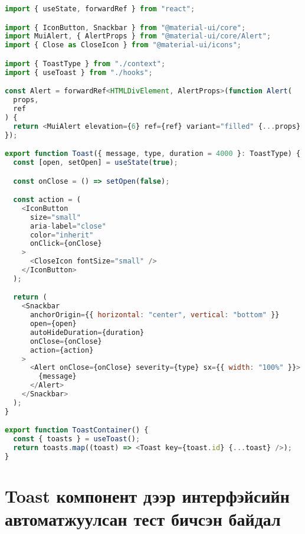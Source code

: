 \begin{lstlisting}[language=Javascript, frame=single]
import { useState, forwardRef } from "react";

import { IconButton, Snackbar } from "@material-ui/core";
import MuiAlert, { AlertProps } from "@material-ui/core/Alert";
import { Close as CloseIcon } from "@material-ui/icons";

import { ToastType } from "./context";
import { useToast } from "./hooks";

const Alert = forwardRef<HTMLDivElement, AlertProps>(function Alert(
  props,
  ref
) {
  return <MuiAlert elevation={6} ref={ref} variant="filled" {...props} />;
});

export function Toast({ message, type, duration = 4000 }: ToastType) {
  const [open, setOpen] = useState(true);

  const onClose = () => setOpen(false);

  const action = (
    <IconButton
      size="small"
      aria-label="close"
      color="inherit"
      onClick={onClose}
    >
      <CloseIcon fontSize="small" />
    </IconButton>
  );

  return (
    <Snackbar
      anchorOrigin={{ horizontal: "center", vertical: "bottom" }}
      open={open}
      autoHideDuration={duration}
      onClose={onClose}
      action={action}
    >
      <Alert onClose={onClose} severity={type} sx={{ width: "100%" }}>
        {message}
      </Alert>
    </Snackbar>
  );
}

export function ToastContainer() {
  const { toasts } = useToast();
  return toasts.map((toast) => <Toast key={toast.id} {...toast} />);
}
\end{lstlisting}
\pagebreak
\section{Toast компонент дээр интерфэйсийн автоматжуулсан тест бичсэн байдал}

